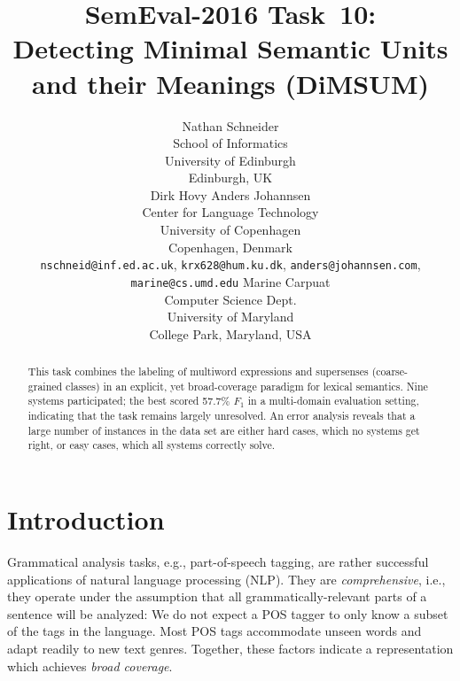 \documentclass[11pt,letterpaper]{article}
\title{SemEval-2016 Task~10:\\ Detecting Minimal Semantic Units and their Meanings (DiMSUM)}
\author{
Nathan Schneider \\
		School of Informatics\\
	   	University of Edinburgh\\
	    Edinburgh, UK\\ %
	\And
Dirk Hovy \quad Anders Johannsen\\
Center for Language Technology\\
University of Copenhagen\\
Copenhagen, Denmark\\
{\tt nschneid@inf.ed.ac.uk}, {\tt krx628@hum.ku.dk}, {\tt anders@johannsen.com}, {\tt marine@cs.umd.edu} 
    \And
Marine Carpuat\\
Computer Science Dept.\\
University of Maryland\\
College Park, Maryland, USA\\ %
}
\date{}
\newcommand{\ensuretext}[1]{#1}
\newcommand{\nssmarker}{\ensuretext{\textcolor{magenta}{\ensuremath{^{\textsc{NS}}_{\textsc{S}}}}}}
\newcommand{\dhmarker}{\ensuretext{\textcolor{red}{\ensuremath{^{\textsc{D}}_{\textsc{H}}}}}}
\newcommand{\arkcomment}[3]{\ensuretext{\textcolor{#3}{[#1 #2]}}}
\newcommand{\nss}[1]{\arkcomment{\nssmarker}{#1}{magenta}}
\newcommand{\dirk}[1]{\arkcomment{\dhmarker}{#1}{red}}
\newcommand{\longversion}[1]{#1} %
\begin{document}
\naaclfinalcopy %
\maketitle

\begin{abstract}
This task combines the labeling of multiword expressions and supersenses (coarse-grained classes) in an explicit, yet broad-coverage paradigm for lexical semantics.
Nine systems participated; the best scored 57.7\% $F_1$ in a multi-domain evaluation setting, 
indicating that the task remains largely unresolved. 
An error analysis reveals that a large number of instances in the data set are either hard cases, 
which no systems get right, or easy cases, which all systems correctly solve.
\end{abstract}

\section{Introduction}\label{sec:intro}



Grammatical analysis tasks, e.g., part-of-speech tagging, are rather successful applications of natural language processing (NLP).  They are \emph{comprehensive}, i.e., they 
operate under the assumption that all grammatically-relevant parts of a sentence  
will be analyzed: We do not expect a POS tagger to only know a subset of the tags in the language. 
Most POS tags accommodate unseen words and adapt readily to new text genres.
Together, these factors indicate a representation which achieves \emph{broad coverage}. 
\end{document}
